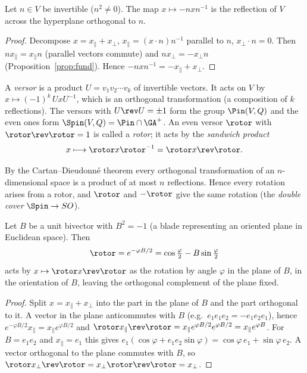 
\begin{theorem}[Reflections]\label{thm:refl}
Let $n\in V$ be invertible ($n^2\neq0$). The map $x\mapsto -nxn^{-1}$ is the reflection of $V$ across the hyperplane orthogonal to $n$.
\end{theorem}
\begin{proof}
Decompose $x=x_\parallel+x_\perp$, $x_\parallel=(x\cdot n)n^{-1}$ parallel to $n$, $x_\perp\cdot n=0$. Then $nx_\parallel=x_\parallel n$ (parallel vectors commute) and $nx_\perp=-x_\perp n$ (Proposition~\ref{prop:fund}). Hence
$-nxn^{-1}=-x_\parallel+x_\perp$.
\end{proof}

\begin{definition}
A \emph{versor} is a product $U=v_1v_2\cdots v_k$ of invertible vectors. It acts on $V$ by
$x\mapsto(-1)^k\,UxU^{-1}$, which is an orthogonal transformation (a composition of $k$ reflections). The versors with $U\rev U=\pm1$ form the group $\Pin(V,Q)$ and the even ones form $\Spin(V,Q)=\Pin\cap\GA^+$. An even versor $\rotor$ with $\rotor\rev \rotor=1$ is called a \emph{rotor}; it acts by the \emph{sandwich product}
\[
 x\longmapsto \rotor x\rotor^{-1}=\rotor x\rev \rotor  .
\]
\end{definition}

By the Cartan--Dieudonn\'e theorem every orthogonal transformation of an $n$-dimensional space is a product of at most $n$ reflections. Hence every rotation arises from a rotor, and $\rotor$ and $-\rotor$ give the same rotation (the \emph{double cover} $\Spin\to SO$).

\begin{theorem}\label{thm:rotor}
Let $B$ be a unit bivector with $B^2=-1$ (a blade representing an oriented plane in Euclidean space). Then
\[
 \rotor=e^{-\varphi B/2}=\cos\tfrac\varphi2-B\sin\tfrac\varphi2
\]
acts by $x\mapsto \rotor x\rev \rotor$ as the rotation by angle $\varphi$ in the plane of $B$, in the orientation of $B$, leaving the orthogonal complement of the plane fixed.
\end{theorem}
\begin{proof}
Split $x=x_\parallel+x_\perp$ into the part in the plane of $B$ and the part orthogonal to it. A vector in the plane anticommutes with $B$ (e.g.\ $e_1e_1e_2=-e_1e_2e_1$), hence $e^{-\varphi B/2}x_\parallel=x_\parallel e^{\varphi B/2}$ and
$\rotor x_\parallel\rev \rotor=x_\parallel e^{\varphi B/2}e^{\varphi B/2}=x_\parallel e^{\varphi B}$. For $B=e_1e_2$ and $x_\parallel=e_1$ this gives $e_1(\cos\varphi+e_1e_2\sin\varphi)=\cos\varphi\,e_1+\sin\varphi\,e_2$. A vector orthogonal to the plane commutes with $B$, so $\rotor x_\perp\rev \rotor=x_\perp \rotor\rev \rotor=x_\perp$.
\end{proof}

